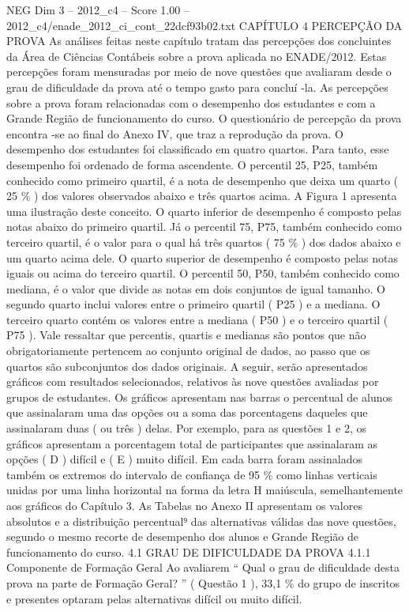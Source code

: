 \begin{textsample}{NEG Dim 3 – 2012\_c4 – Score 1.00 – 2012\_c4/enade\_2012\_ci\_cont\_22dcf93b02.txt}  \label{ex:f3_neg_134}
CAPÍTULO 4 PERCEPÇÃO DA PROVA As análises feitas neste capítulo tratam das percepções dos concluintes da Área de Ciências Contábeis sobre a prova aplicada no ENADE/2012.
Estas percepções foram mensuradas por meio de nove questões que avaliaram desde o grau de dificuldade da prova até o tempo gasto para concluí -la.
As percepções sobre a prova foram relacionadas com o desempenho dos estudantes e com a Grande Região de funcionamento do curso.
O questionário de percepção da prova encontra -se ao final do Anexo IV, que traz a reprodução da prova.
O desempenho dos estudantes foi classificado em quatro quartos.
Para tanto, esse desempenho foi ordenado de forma ascendente.
O percentil 25, P25, também conhecido como primeiro quartil, é a nota de desempenho que deixa um quarto ( 25 \% ) dos valores observados abaixo e três quartos acima.
A Figura 1 apresenta uma ilustração deste conceito.
O quarto inferior de desempenho é composto pelas notas abaixo do primeiro quartil.
Já o percentil 75, P75, também conhecido como terceiro quartil, é o valor para o qual há três quartos ( 75 \% ) dos dados abaixo e um quarto acima dele.
O quarto superior de desempenho é composto pelas notas iguais ou acima do terceiro quartil.
O percentil 50, P50, também conhecido como mediana, é o valor que divide as notas em dois conjuntos de igual tamanho.
O segundo quarto inclui valores entre o primeiro quartil ( P25 ) e a mediana.
O terceiro quarto contém os valores entre a mediana ( P50 ) e o terceiro quartil ( P75 ).
Vale ressaltar que percentis, quartis e medianas são pontos que não obrigatoriamente pertencem ao conjunto original de dados, ao passo que os quartos são subconjuntos dos dados originais.
A seguir, serão apresentados gráficos com resultados selecionados, relativos às nove questões avaliadas por grupos de estudantes.
Os gráficos apresentam nas barras o percentual de alunos que assinalaram uma das opções ou a soma das porcentagens daqueles que assinalaram duas ( ou três ) delas.
Por exemplo, para as questões 1 e 2, os gráficos apresentam a porcentagem total de participantes que assinalaram as opções ( D ) difícil e ( E ) muito difícil.
Em cada barra foram assinalados também os extremos do intervalo de confiança de 95 \% como linhas verticais unidas por uma linha horizontal na forma da letra H maiúscula, semelhantemente aos gráficos do Capítulo 3.
As Tabelas no Anexo II apresentam os valores absolutos e a distribuição percentual⁹ das alternativas válidas das nove questões, segundo o mesmo recorte de desempenho dos alunos e Grande Região de funcionamento do curso. 4.1 GRAU DE DIFICULDADE DA PROVA 4.1.1 Componente de Formação Geral Ao avaliarem “ Qual o grau de dificuldade desta prova na parte de Formação Geral? ” ( Questão 1 ), 33,1 \% do grupo de inscritos e presentes optaram pelas alternativas difícil ou muito difícil.

\end{textsample}
